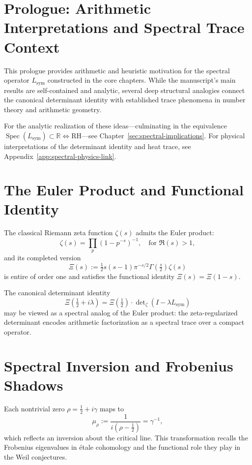 \section*{Prologue: Arithmetic Interpretations and Spectral Trace Context}

This prologue provides arithmetic and heuristic motivation for the spectral operator \( L_{\mathrm{sym}} \) constructed in the core chapters. While the manuscript’s main results are self-contained and analytic, several deep structural analogies connect the canonical determinant identity with established trace phenomena in number theory and arithmetic geometry.

\medskip
\noindent
For the analytic realization of these ideas—culminating in the equivalence \( \operatorname{Spec}(L_{\mathrm{sym}}) \subset \mathbb{R} \iff \mathrm{RH} \)—see Chapter~\ref{sec:spectral-implications}. For physical interpretations of the determinant identity and heat trace, see Appendix~\ref{app:spectral-physics-link}.

\section*{The Euler Product and Functional Identity}

The classical Riemann zeta function \( \zeta(s) \) admits the Euler product:
\[
\zeta(s) = \prod_p \left(1 - p^{-s} \right)^{-1}, \quad \text{for } \Re(s) > 1,
\]
and its completed version
\[
\Xi(s) := \tfrac{1}{2} s(s - 1) \pi^{-s/2} \Gamma\left( \tfrac{s}{2} \right) \zeta(s)
\]
is entire of order one and satisfies the functional identity \( \Xi(s) = \Xi(1 - s) \).

The canonical determinant identity
\[
\Xi\left( \tfrac{1}{2} + i\lambda \right) = \Xi\left( \tfrac{1}{2} \right) \cdot \det\nolimits_\zeta(I - \lambda L_{\mathrm{sym}})
\]
may be viewed as a spectral analog of the Euler product: the zeta-regularized determinant encodes arithmetic factorization as a spectral trace over a compact operator.

\section*{Spectral Inversion and Frobenius Shadows}

Each nontrivial zero \( \rho = \tfrac{1}{2} + i\gamma \) maps to
\[
\mu_\rho := \frac{1}{i(\rho - \tfrac{1}{2})} = \gamma^{-1},
\]
which reflects an inversion about the critical line. This transformation recalls the Frobenius eigenvalues in étale cohomology and the functional role they play in the Weil conjectures.

